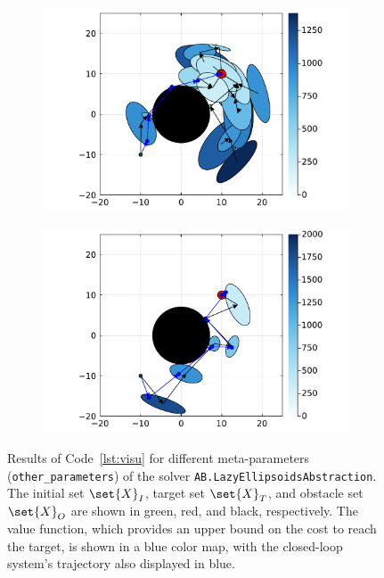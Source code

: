 \documentclass{juliacon}
\begin{document}
\begin{figure}
    \centering
    \begin{subfigure}{0.49\textwidth}
        \centering
        \includegraphics[width=\textwidth,trim=35 0 40 0, clip]{Figures/Example/abs_1.pdf}
        \caption{}
        \label{fig:ex_plot_1}
    \end{subfigure}
    \hfill
    \begin{subfigure}{0.49\textwidth}
        \centering
        \includegraphics[width=\textwidth,trim=35 0 40 0, clip]{Figures/Example/abs_2.pdf}
        \caption{}
        \label{fig:ex_plot_2}
    \end{subfigure}
    \caption{
    \color{red} Results of Code~\ref{lst:visu} for different meta-parameters (\texttt{other\_parameters}) of the solver \texttt{AB.LazyEllipsoidsAbstraction}. 
    The initial set $\set{X}_I$, target set $\set{X}_T$, and obstacle set $\set{X}_O$ are shown in green, red, and black, respectively. The value function, which provides an upper bound on the cost to reach the target, is shown in a blue color map, with the closed-loop system's trajectory also displayed in blue. \color{black}}
    \label{fig:ex_plot}
\end{figure}
\end{document}
